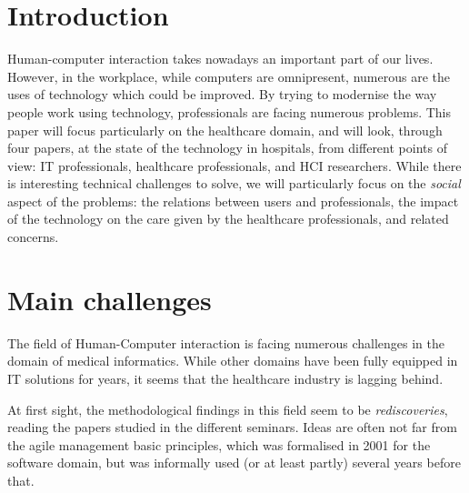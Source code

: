 \documentclass[a4paper,10pt]{article}
\begin{document}
\begin{multicols}{2}
\section{Introduction}

Human-computer interaction takes nowadays an important part of our lives.
However, in the workplace, while computers are omnipresent, numerous are the
uses of technology which could be improved. By trying to modernise the way
people
work using technology, professionals are facing numerous problems.
This paper will focus particularly on the healthcare domain, and will look,
through four %
papers, at the state of the technology in hospitals, from different points of
view: IT professionals, healthcare professionals, and HCI researchers. While
there is interesting technical challenges to solve, we will particularly focus
on the \emph{social} aspect of the problems: the relations between users and
professionals, the impact of the technology on the care given by the healthcare
professionals, and related concerns.

\section{Main challenges}

The field of Human-Computer interaction is facing numerous challenges in the
domain of medical informatics.
While other domains have been fully equipped in IT solutions for years, it seems
that the healthcare industry is lagging behind.

At first sight, the methodological findings in this field seem to be
\emph{rediscoveries}, reading the papers studied in the different seminars.
Ideas are often not far from the agile management basic principles, which was
formalised in 2001\cite{AgileManifesto} for the software domain, but was
informally used (or at least partly) several years before that.


\end{multicols}
\end{document}
